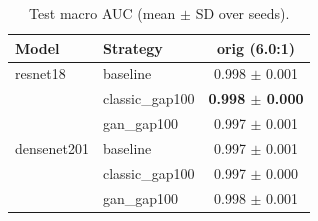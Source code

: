 \begin{table}[htbp]
\centering
\caption{Test macro AUC (mean $\pm$ SD over seeds).}
\label{tab:macro_auc}
\begin{tabular}{llc}
\toprule
Model & Strategy & orig (6.0:1) \\
\midrule
resnet18 & baseline & 0.998 $\pm$ 0.001 \\
 & classic\_gap100 & \textbf{0.998 $\pm$ 0.000} \\
 & gan\_gap100 & 0.997 $\pm$ 0.001 \\
\addlinespace
densenet201 & baseline & 0.997 $\pm$ 0.001 \\
 & classic\_gap100 & 0.997 $\pm$ 0.000 \\
 & gan\_gap100 & 0.998 $\pm$ 0.001 \\
\bottomrule
\end{tabular}
\end{table}